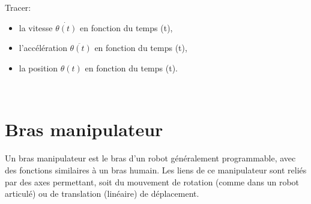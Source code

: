 Tracer:
\begin{itemize}
 \item la vitesse $\dot{\theta(t)}$ en fonction du temps (t),
 \item l'accélération $\ddot{\theta(t)}$ en fonction du temps (t),
 \item la position $\theta(t)$ en fonction du temps (t).
\end{itemize}

~\

\newpage

\section{Bras manipulateur}

Un bras manipulateur est le bras d'un robot généralement programmable, avec des fonctions similaires à un bras humain. Les liens de ce manipulateur sont reliés par des axes permettant, soit du mouvement de rotation (comme dans un robot articulé) ou de translation (linéaire) de déplacement.

